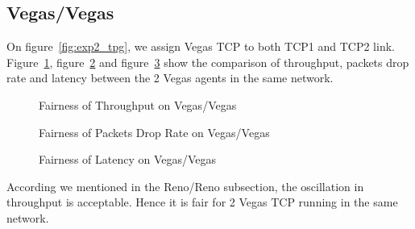 \documentclass[10pt, conference]{lib/IEEEtran}
\begin{document}
\subsection{Vegas/Vegas}
On figure~\ref{fig:exp2_tpg}, we assign Vegas TCP to both TCP1 and TCP2 link. Figure~\ref{fig:exp2_thp_vv}, 
figure~\ref{fig:exp2_dr_vv} and figure~\ref{fig:exp2_lt_vv} show the comparison of throughput, packets drop rate and 
latency between the 2 Vegas agents in the same network.
\vspace{-0.2in}
\begin{figure}[H]
    \centering
    \resizebox{0.9\linewidth}{!}{}
    \caption{Fairness of Throughput on Vegas/Vegas}
    \label{fig:exp2_thp_vv}
\end{figure}
\vspace{-0.3in}
\begin{figure}[H]
    \centering
    \resizebox{0.9\linewidth}{!}{}
    \caption{Fairness of Packets Drop Rate on Vegas/Vegas}
    \label{fig:exp2_dr_vv}
\end{figure}
\vspace{-0.3in}
\begin{figure}[H]
    \centering
    \resizebox{0.9\linewidth}{!}{}
    \caption{Fairness of Latency on Vegas/Vegas}
    \label{fig:exp2_lt_vv}
\end{figure}
According we mentioned in the Reno/Reno subsection, the oscillation in throughput is acceptable. Hence it is fair 
for 2 Vegas TCP running in the same network.
\end{document}
